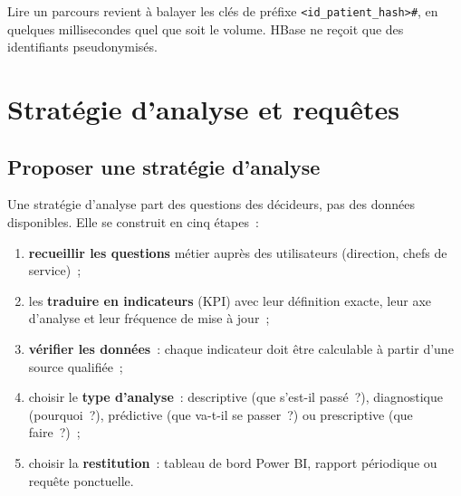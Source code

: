 \begin{center}
\end{center}

\noindent Lire un parcours revient à balayer les clés de préfixe \texttt{<id\_patient\_hash>\#}, en quelques millisecondes quel que soit le volume. HBase ne reçoit que des identifiants pseudonymisés.

\newpage
\section{Stratégie d'analyse et requêtes}

\subsection{Proposer une stratégie d'analyse}

\noindent Une stratégie d'analyse part des questions des décideurs, pas des données disponibles. Elle se construit en cinq étapes~:
\begin{enumerate}
	\item \textbf{recueillir les questions} métier auprès des utilisateurs (direction, chefs de service)~;
	\item les \textbf{traduire en indicateurs} (KPI) avec leur définition exacte, leur axe d'analyse et leur fréquence de mise à jour~;
	\item \textbf{vérifier les données}~: chaque indicateur doit être calculable à partir d'une source qualifiée~;
	\item choisir le \textbf{type d'analyse}~: descriptive (que s'est-il passé~?), diagnostique (pourquoi~?), prédictive (que va-t-il se passer~?) ou prescriptive (que faire~?)~;
	\item choisir la \textbf{restitution}~: tableau de bord Power BI, rapport périodique ou requête ponctuelle.
\end{enumerate}

